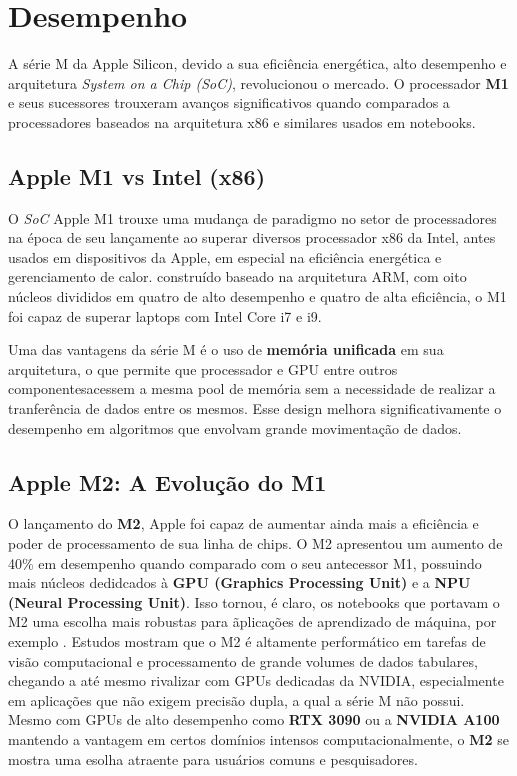 \documentclass[a4paper,times,12pt]{article}
\begin{document}
\newpage
\section{Desempenho}
\hspace{+15pt}
A série M da Apple Silicon, devido a sua eficiência energética, alto desempenho e arquitetura \textit{System on a Chip (SoC)}, revolucionou o mercado. O processador \textbf{M1} e seus sucessores trouxeram avanços significativos quando comparados a processadores baseados na arquitetura x86 e similares usados em notebooks.

\subsection{Apple M1 vs Intel (x86)}
\hspace{+15pt}
O \textit{SoC} Apple M1 trouxe uma mudança de paradigmo no setor de processadores na época de seu lançamente ao superar diversos processador x86 da Intel, antes usados em dispositivos da Apple, em especial na eficiência energética e gerenciamento de calor. construído baseado na arquitetura ARM, com oito núcleos divididos em quatro de alto desempenho e quatro de alta eficiência, o M1 foi capaz de superar laptops com Intel Core i7 e i9.

Uma das vantagens da série M é o uso de \textbf{memória unificada} em sua arquitetura, o que permite que processador e GPU entre outros componentesacessem a mesma pool de memória sem a necessidade de realizar a tranferência de dados entre os mesmos.\cite{apple_silicon_potential} Esse design melhora significativamente o desempenho em algoritmos que envolvam grande movimentação de dados.\cite{apple_m_vs_intel}

\subsection{Apple M2: A Evolução do M1}
\hspace{+15pt}
O lançamento do \textbf{M2}, Apple foi capaz de aumentar ainda mais a eficiência e poder de processamento de sua linha de chips. O M2 apresentou um aumento de 40\% em desempenho quando comparado com o seu antecessor M1, possuindo mais núcleos dedidcados à \textbf{GPU (Graphics Processing Unit)} e a \textbf{NPU (Neural Processing Unit)}. Isso tornou, é claro, os notebooks que portavam o M2 uma escolha mais robustas para ãplicações de aprendizado de máquina, por exemplo \cite{usability_ml}. Estudos mostram que o M2 é altamente performático em tarefas de visão computacional e processamento de grande volumes de dados tabulares, chegando a até mesmo rivalizar com GPUs dedicadas da NVIDIA, especialmente em aplicações que não exigem precisão dupla, a qual a série M não possui. Mesmo com GPUs de alto desempenho como \textbf{RTX 3090} ou a \textbf{NVIDIA A100} mantendo a vantagem em certos domínios intensos computacionalmente, o \textbf{M2} se mostra uma esolha atraente para usuários comuns e pesquisadores.\cite{usability_ml}
\end{document}
